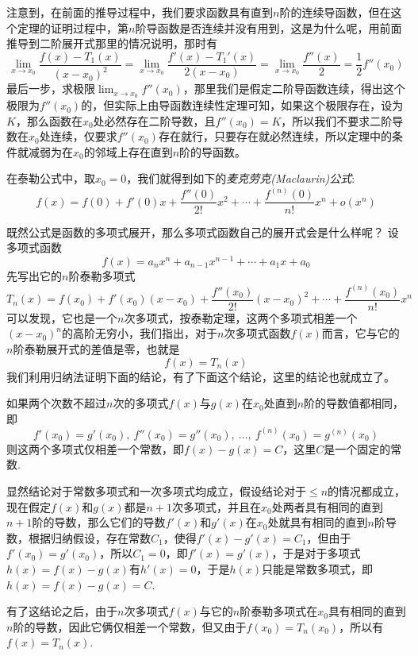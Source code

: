 注意到，在前面的推导过程中，我们要求函数具有直到$n$阶的连续导函数，但在这个定理的证明过程中，第$n$阶导函数是否连续并没有用到，这是为什么呢，用前面推导到二阶展开式那里的情况说明，那时有
\[ \lim_{x \to x_0} \frac{f(x)-T_1(x)}{(x-x_0)^2} = \lim_{x \to x_0} \frac{f'(x)-T_1'(x)}{2(x-x_0)} = \lim_{x \to x_0} \frac{f''(x)}{2} = \frac{1}{2} f''(x_0) \]
最后一步，求极限$\lim_{x \to x_0} f''(x_0)$，那里我们是假定二阶导函数连续，得出这个极限为$f''(x_0)$的，但实际上由导函数连续性定理可知，如果这个极限存在，设为$K$，那么函数在$x_0$处必然存在二阶导数，且$f''(x_0)=K$，所以我们不要求二阶导数在$x_0$处连续，仅要求$f''(x_0)$存在就行，只要存在就必然连续，所以定理中的条件就减弱为在$x_0$的邻域上存在直到$n$阶的导函数。

在泰勒公式中，取$x_0 = 0$，我们就得到如下的\emph{麦克劳克(Maclaurin)公式}:
\[ f(x) = f(0) + f'(0)x + \frac{f''(0)}{2!}x^2 + \cdots + \frac{f^{(n)}(0)}{n!}x^n + o(x^n) \]

\begin{example}
  既然公式是函数的多项式展开，那么多项式函数自己的展开式会是什么样呢？ 设多项式函数
  \[ f(x) = a_nx^n+a_{n-1}x^{n-1}+\cdots+a_1x+a_0 \]
  先写出它的$n$阶泰勒多项式
\[ T_n(x) = f(x_0) + f'(x_0)(x-x_0)+\frac{f''(x_0)}{2!}(x-x_0)^2+ \cdots +\frac{f^{(n)}(x_0)}{n!}x^n \]
可以发现，它也是一个$n$次多项式，按泰勒定理，这两个多项式相差一个$(x-x_0)^n$的高阶无穷小，我们指出，对于$n$次多项式函数$f(x)$而言，它与它的$n$阶泰勒展开式的差值是零，也就是
\[ f(x) = T_n(x) \]
我们利用归纳法证明下面的结论，有了下面这个结论，这里的结论也就成立了。

\begin{statement}
  如果两个次数不超过$n$次的多项式$f(x)$与$g(x)$在$x_0$处直到$n$阶的导数值都相同，即
  \[ f'(x_0) = g'(x_0), \  f''(x_0) = g''(x_0), \  \ldots, \  f^{(n)}(x_0) = g^{(n)}(x_0) \]
  则这两个多项式仅相差一个常数，即$f(x)-g(x)=C$，这里$C$是一个固定的常数.
\end{statement}

显然结论对于常数多项式和一次多项式均成立，假设结论对于$\leqslant n$的情况都成立，现在假定$f(x)$和$g(x)$都是$n+1$次多项式，并且在$x_0$处两者具有相同的直到$n+1$阶的导数，那么它们的导数$f'(x)$和$g'(x)$在$x_0$处就具有相同的直到$n$阶导数，根据归纳假设，存在常数$C_1$，使得$f'(x)-g'(x)=C_1$，但由于$f'(x_0)=g'(x_0)$，所以$C_1=0$，即$f'(x)=g'(x)$，于是对于多项式$h(x)=f(x)-g(x)$有$h'(x)=0$，于是$h(x)$只能是常数多项式，即$h(x)=f(x)-g(x)=C$.
\end{example}

有了这结论之后，由于$n$次多项式$f(x)$与它的$n$阶泰勒多项式在$x_0$具有相同的直到$n$阶的导数，因此它俩仅相差一个常数，但又由于$f(x_0)=T_n(x_0)$，所以有$f(x)=T_n(x)$.


